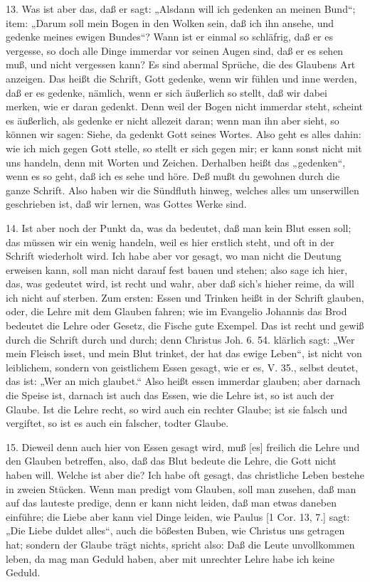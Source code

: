 13. Was ist aber das, daß er sagt: „Alsdann will ich gedenken an meinen Bund“; item: „Darum soll mein Bogen in den Wolken sein, daß ich ihn ansehe, und gedenke meines ewigen Bundes“? Wann ist er einmal so schläfrig, daß er es vergesse, so doch alle Dinge immerdar vor seinen Augen sind, daß er es sehen muß, und nicht vergessen kann? Es sind abermal Sprüche, die des Glaubens Art anzeigen. Das heißt die Schrift, Gott gedenke, wenn wir fühlen und inne werden, daß er es gedenke, nämlich, wenn er sich äußerlich so stellt, daß wir dabei merken, wie er daran gedenkt. Denn weil der Bogen nicht immerdar steht, scheint es äußerlich, als gedenke er nicht allezeit daran; wenn man ihn aber sieht, so können wir sagen: Siehe, da gedenkt Gott seines Wortes. Also geht es alles dahin: wie ich mich gegen Gott stelle, so stellt er sich gegen mir; er kann sonst nicht mit uns handeln, denn mit Worten und Zeichen. Derhalben heißt das „gedenken“, wenn es so geht, daß ich es sehe und höre. Deß mußt du gewohnen durch die ganze Schrift. Also haben wir die Sündfluth hinweg, welches alles um unserwillen geschrieben ist, daß wir lernen, was Gottes Werke sind.

14. Ist aber noch der Punkt da, was da bedeutet, daß man kein Blut essen soll; das müssen wir ein wenig handeln, weil es hier erstlich steht, und oft in der Schrift wiederholt wird. Ich habe aber vor gesagt, wo man nicht die Deutung erweisen kann, soll man nicht darauf fest bauen und stehen; also sage ich hier, das, was gedeutet wird, ist recht und wahr, aber daß sich's hieher reime, da will ich nicht auf sterben. Zum ersten: Essen und Trinken heißt in der Schrift glauben, oder, die Lehre mit dem Glauben fahren; wie im Evangelio Johannis das Brod bedeutet die Lehre oder Gesetz, die Fische gute Exempel. Das ist recht und gewiß durch die Schrift durch und durch; denn Christus Joh. 6. 54. klärlich sagt: „Wer mein Fleisch isset, und mein Blut trinket, der hat das ewige Leben“, ist nicht von leiblichem, sondern von geistlichem Essen gesagt, wie er es, V. 35., selbst deutet, das ist: „Wer an mich glaubet.“ Also heißt essen immerdar glauben; aber darnach die Speise ist, darnach ist auch das Essen, wie die Lehre ist, so ist auch der Glaube. Ist die Lehre recht, so wird auch ein rechter Glaube; ist sie falsch und vergiftet, so ist es auch ein falscher, todter Glaube.

15. Dieweil denn auch hier von Essen gesagt wird, muß [es] freilich die Lehre und den Glauben betreffen, also, daß das Blut bedeute die Lehre, die Gott nicht haben will. Welche ist aber die? Ich habe oft gesagt, das christliche Leben bestehe in zweien Stücken. Wenn man predigt vom Glauben, soll man zusehen, daß man auf das lauteste predige, denn er kann nicht leiden, daß man etwas daneben einführe; die Liebe aber kann viel Dinge leiden, wie Paulus [1 Cor. 13, 7.] sagt: „Die Liebe duldet alles“, auch die bößesten Buben, wie Christus uns getragen hat; sondern der Glaube trägt nichts, spricht also: Daß die Leute unvollkommen leben, da mag man Geduld haben, aber mit unrechter Lehre habe ich keine Geduld.


